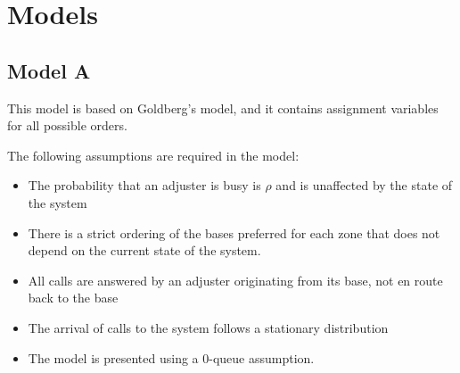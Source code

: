 
\section{Models}
\subsection{Model A}

\begin{frame}
  This model is based on Goldberg's model, and it contains assignment
  variables for all possible orders.

  The following assumptions are required in the model:
  \begin{itemize}
  \item The probability that an adjuster is busy is $\rho$
    and is unaffected by the state of the system
  \item There is a strict ordering of the bases preferred for each zone
    that does not depend on the current state of the system. 
  \item All calls are answered by an adjuster originating from its base,
    not en route back to the base
  \item The arrival of calls to the system follows a stationary distribution
  \item The model is presented using a 0-queue assumption.
  \end{itemize}
  
\end{frame}


